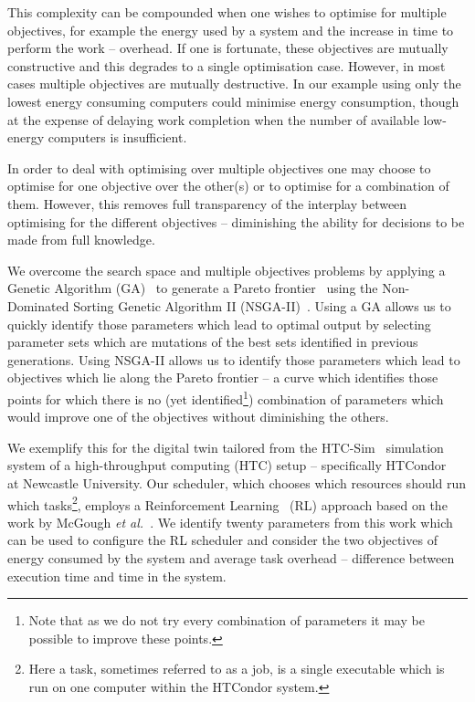 \documentclass[10pt, conference, compsocconf]{IEEEtran}
\begin{document}
This complexity can be compounded when one wishes to optimise for multiple objectives, for example the energy used by a system and the increase in time to perform the work -- overhead. If one is fortunate, these objectives are mutually constructive and this degrades to a single optimisation case. However, in most cases multiple objectives are mutually destructive. In our example using only the lowest energy consuming computers could minimise energy consumption, though at the expense of delaying work completion when the number of available low-energy computers is insufficient.

In order to deal with optimising over multiple objectives one may choose to optimise for one objective over the other(s) or to optimise for a combination of them. However, this removes full transparency of the interplay between optimising for the different objectives -- diminishing the ability for decisions to be made from full knowledge.

We overcome the search space and multiple objectives problems by applying a Genetic Algorithm (GA)~\cite{mitchell1995genetic} to generate a Pareto frontier~\cite{Pareto1927, Stadler1979} using the Non-Dominated Sorting Genetic Algorithm II (NSGA-II)~\cite{Valkanas2014}. Using a GA allows us to quickly identify those parameters which lead to optimal output by selecting parameter sets which are mutations of the best sets identified in previous generations. Using NSGA-II allows us to identify those parameters which lead to objectives which lie along the Pareto frontier -- a curve which identifies those points for which there is no (yet identified\footnote{Note that as we do not try every combination of parameters it may be possible to improve these points.}) combination of parameters which would improve one of the objectives without diminishing the others.

We exemplify this for the digital twin tailored from the HTC-Sim~\cite{htc-sim} simulation system of a high-throughput computing (HTC) setup -- specifically HTCondor~\cite{htcondor} at Newcastle University. Our scheduler, which chooses which resources should run which tasks\footnote{Here a task, sometimes referred to as a job, is a single executable which is run on one computer within the HTCondor system.}, employs a Reinforcement Learning~\cite{rl} (RL) approach based on the work by McGough \textit{et al.}~\cite{suscom}. We identify twenty parameters from this work which can be used to configure the RL scheduler and consider the two objectives of energy consumed by the system and average task overhead -- difference between execution time and time in the system.
\end{document}
